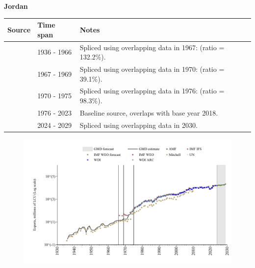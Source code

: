 \documentclass[12pt,a4paper,landscape]{article}
\begin{document}
\begin{adjustbox}{max totalsize={\paperwidth}{\paperheight},center}
\begin{minipage}[t][\textheight][t]{\textwidth}
\vspace*{0.5cm}
{}
\begin{center}
{\Large\bfseries Jordan}
\end{center}
\vspace{0.5cm}
\begin{table}[H]
\centering
\small
\begin{tabular}{|l|l|l|}
\hline
\textbf{Source} & \textbf{Time span} & \textbf{Notes} \\
\hline
\rowcolor{white}\cite{Mitchell}& 1936 - 1966 &Spliced using overlapping data in 1967: (ratio = 132.2\%).\\
\rowcolor{lightgray}\cite{IMF_IFS}& 1967 - 1969 &Spliced using overlapping data in 1970: (ratio = 39.1\%).\\
\rowcolor{white}\cite{UN}& 1970 - 1975 &Spliced using overlapping data in 1976: (ratio = 98.3\%).\\
\rowcolor{lightgray}\cite{WDI}& 1976 - 2023 &Baseline source, overlaps with base year 2018.\\
\rowcolor{white}\cite{IMF_WEO_forecast}& 2024 - 2029 &Spliced using overlapping data in 2030.\\
\hline
\end{tabular}
\end{table}
\begin{figure}[H]
\centering
\includegraphics[width=\textwidth,height=0.6\textheight,keepaspectratio]{graphs/JOR_exports.pdf}
\end{figure}
\end{minipage}
\end{adjustbox}
\end{document}
